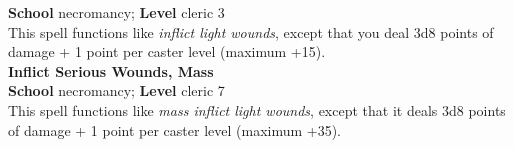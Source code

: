 \textbf{School} necromancy; \textbf{Level} cleric 3\\
This spell functions like \textit{inflict light wounds}, except that you deal 3d8 points of damage + 1 point per caster level (maximum +15).\\
\textbf{Inflict Serious Wounds, Mass}\\
\textbf{School} necromancy; \textbf{Level} cleric 7\\
This spell functions like \textit{mass inflict light wounds}, except that it deals 3d8 points of damage + 1 point per caster level (maximum +35).\\
